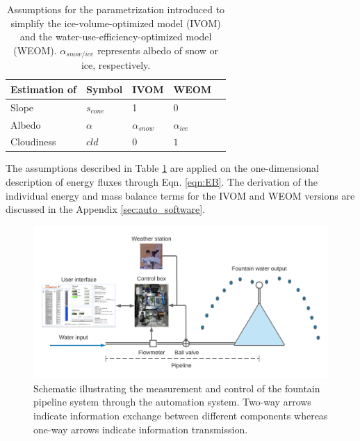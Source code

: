 \begin{table}[htb]
	\centering
	\caption{Assumptions for the parametrization introduced to simplify the ice-volume-optimized model (IVOM) and
		the water-use-efficiency-optimized model (WEOM). $\alpha_{snow/ice}$ represents albedo of snow or ice, respectively.}
	\label{tab:assumptions}
	\begin{tabular}{|lllll|}
		\toprule
		\textbf{Estimation of}          & \textbf{Symbol} & \textbf{IVOM}   & \textbf{WEOM}  &                       \\\midrule
		\multicolumn{1}{|l}{Slope}      & $s_{cone}$      & 1               & 0              & \multicolumn{1}{l|}{} \\
		\multicolumn{1}{|l}{Albedo}     & $\alpha$        & $\alpha_{snow}$ & $\alpha_{ice}$ & \multicolumn{1}{l|}{} \\
		\multicolumn{1}{|l}{Cloudiness} & $cld$           & $0$             & $1$            & \multicolumn{1}{l|}{} \\\bottomrule
	\end{tabular}
\end{table}

The assumptions described in Table \ref{tab:assumptions} are applied on the one-dimensional description of
energy fluxes through Eqn. \ref{eqn:EB}. The derivation of the individual energy and mass balance terms for the
\ac{IVOM} and \ac{WEOM} versions are discussed in the Appendix \ref{sec:auto_software}.

\begin{figure}
\includegraphics[width=\linewidth]{figs/Automation_schematic.png}
\caption{Schematic illustrating the measurement and control of the fountain pipeline system through the
  automation system. Two-way arrows indicate information exchange between different components whereas one-way
  arrows indicate information transmission.}

\label{fig:auto_schematic} 
\end{figure}

